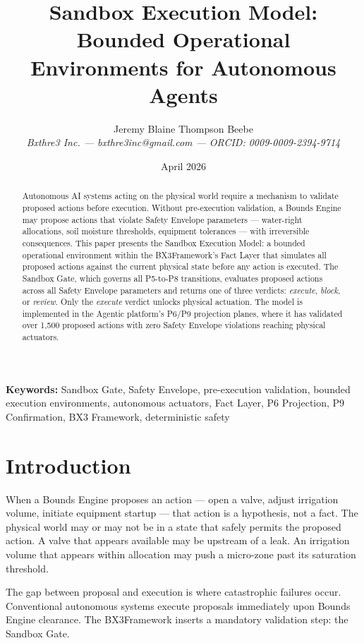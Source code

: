 \documentclass[12pt]{article}
\title{Sandbox Execution Model: Bounded Operational Environments for Autonomous Agents}
\author{Jeremy Blaine Thompson Beebe\\ \textit{Bxthre3 Inc. --- bxthre3inc@gmail.com --- ORCID: 0009-0009-2394-9714}}
\date{April 2026}
\newcommand{\bxthree}{BX3}
\begin{document}
\maketitle

\begin{abstract}
\noindent
Autonomous AI systems acting on the physical world require a mechanism to validate proposed actions before execution. Without pre-execution validation, a Bounds Engine may propose actions that violate Safety Envelope parameters --- water-right allocations, soil moisture thresholds, equipment tolerances --- with irreversible consequences. This paper presents the Sandbox Execution Model: a bounded operational environment within the \bxthree Framework's Fact Layer that simulates all proposed actions against the current physical state before any action is executed. The Sandbox Gate, which governs all P5-to-P8 transitions, evaluates proposed actions across all Safety Envelope parameters and returns one of three verdicts: \textit{execute}, \textit{block}, or \textit{review}. Only the \textit{execute} verdict unlocks physical actuation. The model is implemented in the Agentic platform's P6/P9 projection planes, where it has validated over 1,500 proposed actions with zero Safety Envelope violations reaching physical actuators.
\end{abstract}

\medskip
\noindent\textbf{Keywords:} Sandbox Gate, Safety Envelope, pre-execution validation, bounded execution environments, autonomous actuators, Fact Layer, P6 Projection, P9 Confirmation, BX3 Framework, deterministic safety

\newpage

\section{Introduction}
\label{sec:intro}

When a Bounds Engine proposes an action --- open a valve, adjust irrigation volume, initiate equipment startup --- that action is a hypothesis, not a fact. The physical world may or may not be in a state that safely permits the proposed action. A valve that appears available may be upstream of a leak. An irrigation volume that appears within allocation may push a micro-zone past its saturation threshold.

The gap between proposal and execution is where catastrophic failures occur. Conventional autonomous systems execute proposals immediately upon Bounds Engine clearance. The \bxthree Framework inserts a mandatory validation step: the Sandbox Gate.
\end{document}
